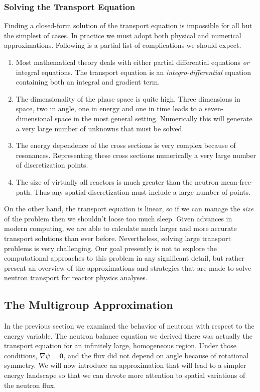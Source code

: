 \documentclass[11pt]{article}
\renewcommand\vec{\mathbf}
\begin{document}
\subsubsection{Solving the Transport Equation}
\label{sec:orgheadline52}
Finding a closed-form solution of the transport equation is impossible for all but the simplest of cases.  In practice we must adopt both physical and numerical approximations.  Following is a partial list of complications we should expect.
\begin{enumerate}
\item Most mathematical theory deals with either partial differential equations \emph{or} integral equations.  The transport equation is an \emph{integro-differential} equation containing both an integral and gradient term.
\item The dimensionality of the phase space is quite high.  Three dimensions in space, two in angle, one in energy and one in time leads to a seven-dimensional space in the most general setting.  Numerically this will generate a very large number of unknowns that must be solved.
\item The energy dependence of the cross sections is very complex because of resonances.  Representing these cross sections numerically a very large number of discretization points.
\item The size of virtually all reactors is much greater than the neutron mean-free-path.  Thus any spatial discretization must include a large number of points.
\end{enumerate}

On the other hand, the transport equation is linear, so if we can manage the \emph{size} of the problem then we shouldn't loose too much sleep.  Given advances in modern computing, we are able to calculate much larger and more accurate transport solutions than ever before.  Nevertheless, solving large transport problems is very challenging.  Our goal presently is not to explore the computational approaches to this problem in any significant detail, but rather present an overview of the approximations and strategies that are made to solve neutron transport for reactor physics analyses.

\subsection{The Multigroup Approximation}
\label{sec:orgheadline54}
In the previous section we examined the behavior of neutrons with respect to the energy variable.  The neutron balance equation we derived there was actually the transport equation for an infinitely large, homogeneous region.  Under those conditions, \(\nabla\psi = \vec{0}\), and the flux did not depend on angle because of rotational symmetry.  We will now introduce an approximation that will lead to a simpler energy landscape so that we can devote more attention to spatial variations of the neutron flux.
\end{document}
